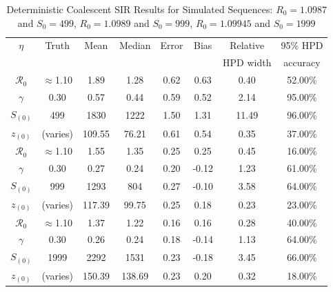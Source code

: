 \documentclass[10pt]{article}
\begin{document}
\begin{table}[!ht]
\begin{center}
\caption{\large{Deterministic Coalescent SIR Results for Simulated Sequences:  
$R_{0}=1.0987$ and $S_{0}=499$, $R_{0}=1.0989$ and $S_{0}=999$, $R_{0}=1.09945$ and $S_{0}=1999$}}
\label{table:simSeq}
\begin{tabular}{|c|c|c|c|c|c|c|c|}
\hline
$\eta$ & Truth & Mean & Median & Error & Bias & Relative & 95\% HPD \\ 
&  &  &  &  &  &  HPD width & accuracy \\ 
	\hline
	\hline
$\mathcal{R}_0$ & $\approx$1.10 & 1.89 & 1.28 & 0.62 & 0.63 & 0.40 & 52.00\% \\
   \hline
$\gamma$ & 0.30 & 0.57 & 0.44 & 0.59 & 0.52 & 2.14 & 95.00\% \\
   \hline
$S_{(0)}$ & 499 & 1830 & 1222 & 1.50 & 1.31 & 11.49 & 96.00\% \\
   \hline
$z_{(0)}$ & (varies) & 109.55 & 76.21 & 0.61 & 0.54 & 0.35 & 37.00\% \\
	\hline
	\hline
	\hline
$\mathcal{R}_0$ & $\approx$1.10 & 1.55 & 1.35 & 0.25 & 0.25 & 0.45 & 16.00\% \\
   \hline
$\gamma$ & 0.30 & 0.27 & 0.24 & 0.20 & -0.12 & 1.23 & 61.00\% \\
   \hline
$S_{(0)}$ & 999 & 1293 & 804 & 0.27 & -0.10 & 3.58 & 64.00\% \\
   \hline
$z_{(0)}$ & (varies) & 117.39 & 99.75 & 0.25 & 0.18 & 0.23 & 23.00\% \\
	\hline
	\hline
	\hline
$\mathcal{R}_0$ & $\approx$1.10 & 1.37 & 1.22 & 0.16 & 0.16 & 0.28 & 40.00\% \\
   \hline
$\gamma$ & 0.30 & 0.26 & 0.24 & 0.18 & -0.14 & 1.13 & 64.00\% \\
   \hline
$S_{(0)}$ & 1999 & 2292 & 1531 & 0.23 & -0.18 & 3.45 & 66.00\% \\
   \hline
$z_{(0)}$ & (varies) & 150.39 & 138.69 & 0.23 & 0.20 & 0.32 & 18.00\% \\
   \hline
\end{tabular}
\end{center}
\end{table}
\end{document}
